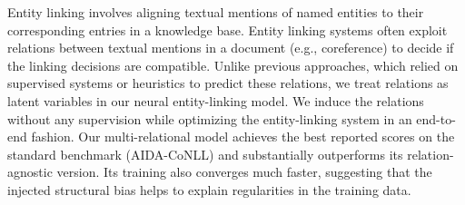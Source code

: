 Entity linking involves aligning textual mentions of named entities to their corresponding entries in a knowledge base. Entity linking systems often exploit relations between textual mentions in a document (e.g., coreference) to decide if the linking decisions are compatible. Unlike previous approaches, which relied on supervised systems or heuristics to predict these relations, we treat relations as latent variables in our neural entity-linking model. We induce the relations without any supervision while optimizing the entity-linking system in an end-to-end fashion. Our multi-relational model achieves the best reported scores on the standard benchmark (AIDA-CoNLL) and substantially outperforms its relation-agnostic version. Its training also converges much faster, suggesting that the injected structural bias helps to explain regularities in the training data.
